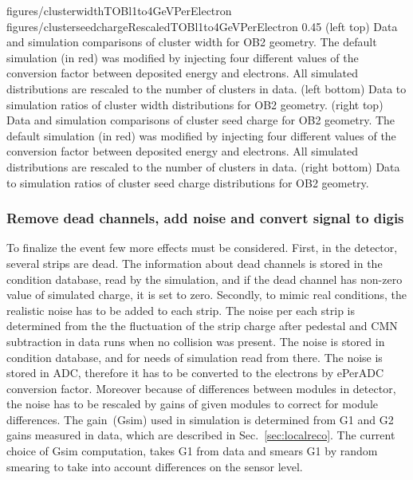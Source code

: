                  {figures/clusterwidthTOBl1to4GeVPerElectron}
                 {figures/clusterseedchargeRescaledTOBl1to4GeVPerElectron} %
                 {0.45}       %
                 {(left top) Data and simulation  comparisons of cluster width for OB2 geometry. The default simulation (in red) was modified by injecting four different values of the conversion factor between deposited energy and electrons. All simulated distributions are rescaled to the number of clusters in data. (left bottom) Data to simulation ratios of cluster width distributions for OB2 geometry. (right top) Data and simulation  comparisons of cluster seed charge for OB2 geometry. The default simulation (in red) was modified by injecting four different values of the conversion factor between deposited energy and electrons. All simulated distributions are rescaled to the number of clusters in data. (right bottom) Data to simulation ratios of cluster seed charge distributions for OB2 geometry. }


\subsubsection{Remove dead channels, add noise and convert signal to digis}

To finalize the event few more effects must be considered. First, in the detector, several strips are dead. The information about dead channels is stored in the condition database, read by the simulation, and if the dead channel has non-zero value of simulated charge, it is set to zero. Secondly, to mimic real conditions, the realistic noise has to be added to each strip. The noise per each strip is determined from the the fluctuation of the strip charge after pedestal and CMN subtraction in data runs when no collision was present. The noise is stored in condition database, and for needs of simulation read from there. The noise is stored in ADC, therefore it has to be converted to the electrons by ePerADC conversion factor. Moreover because of differences between modules in detector, the noise has to be rescaled by gains of given modules to correct for module differences. The gain~(Gsim) used in simulation is determined from G1 and G2 gains measured in data, which are described in Sec.~\ref{sec:localreco}. The current choice of  Gsim computation, takes G1 from data and smears G1 by random smearing to take into account differences on the sensor level.


